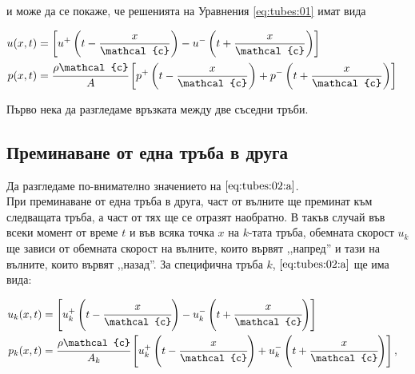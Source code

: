 \documentclass[main.tex]{subfiles}
\begin{document}
и може да се покаже, че решенията на Уравнения \ref{eq:tubes:01} имат вида

\begin{subequations}
    \label{eq:tubes:02}
    \begin{flalign}
        \label{eq:tubes:02:a} u(x, t) & = \Q{u^+\B{t - \frac{x}{\mathcal{c}}} - u^-\B{t + \frac{x}{\mathcal{c}}}} && \\
        p(x, t) & = \cfrac{\rho \mathcal{c}}{A}\Q{p^+\B{t - \frac{x}{\mathcal{c}}} + p^-\B{t + \frac{x}{\mathcal{c}}}} &&
    \end{flalign}
\end{subequations}


Първо нека да разгледаме връзката между две съседни тръби.

\subsection{Преминаване от една тръба в друга}

Да разгледаме по-внимателно значението на $\eqref{eq:tubes:02:a}$.\\
При преминаване от една тръба в друга, част от вълните ще преминат към следващата тръба, а част от тях ще се отразят наобратно.
В такъв случай във всеки момент от време $t$ и във всяка точка $x$ на $k$-тата тръба, обемната скорост $u_k$ ще зависи от обемната скорост на вълните, които вървят ,,напред'' и тази на вълните, които вървят ,,назад''. За специфична тръба $k$, $\eqref{eq:tubes:02:a}$ ще има вида:

\begin{subequations}
    \label{eq:tubes:03}
    \begin{flalign}
        u_{k}(x, t) &= \Q{u_{k}^{+}\B{t - \cfrac{x}{\mathcal{c}}} - u_{k}^{-}\B{t + \cfrac{x}{\mathcal{c}}}} && \\
        p_{k}(x, t) &= \cfrac{\rho \mathcal{c}}{A_{k}} \Q{u_{k}^{+}\B{t - \cfrac{x}{\mathcal{c}}} + u_{k}^{-}\B{t + \cfrac{x}{\mathcal{c}}}},&&
    \end{flalign}
\end{subequations}
\end{document}
